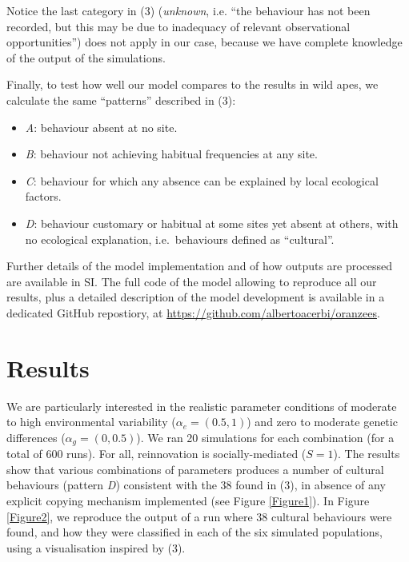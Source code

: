 \documentclass[9pt,twocolumn,twoside,]{pnas-new}
\begin{document}
Notice the last category in (3) (\emph{unknown}, i.e. ``the behaviour
has not been recorded, but this may be due to inadequacy of relevant
observational opportunities'') does not apply in our case, because we
have complete knowledge of the output of the simulations.

Finally, to test how well our model compares to the results in wild
apes, we calculate the same ``patterns'' described in (3):

\begin{itemize}
\item
  \emph{A}: behaviour absent at no site.
\item
  \emph{B}: behaviour not achieving habitual frequencies at any site.
\item
  \emph{C}: behaviour for which any absence can be explained by local
  ecological factors.
\item
  \emph{D}: behaviour customary or habitual at some sites yet absent at
  others, with no ecological explanation, i.e.~behaviours defined as
  ``cultural''.
\end{itemize}

Further details of the model implementation and of how outputs are
processed are available in SI. The full code of the model allowing to
reproduce all our results, plus a detailed description of the model
development is available in a dedicated GitHub repostiory, at
\url{https://github.com/albertoacerbi/oranzees}.

\section*{Results}\label{results}

We are particularly interested in the realistic parameter conditions of
moderate to high environmental variability (\(\alpha_e=(0.5,1)\)) and
zero to moderate genetic differences (\(\alpha_g=(0,0.5)\)). We ran 20
simulations for each combination (for a total of 600 runs). For all,
reinnovation is socially-mediated (\(S=1\)). The results show that
various combinations of parameters produces a number of cultural
behaviours (pattern \emph{D}) consistent with the 38 found in (3), in
absence of any explicit copying mechanism implemented (see Figure
\ref{Figure1}). In Figure \ref{Figure2}, we reproduce the output of a
run where 38 cultural behaviours were found, and how they were
classified in each of the six simulated populations, using a
visualisation inspired by (3).
\end{document}
